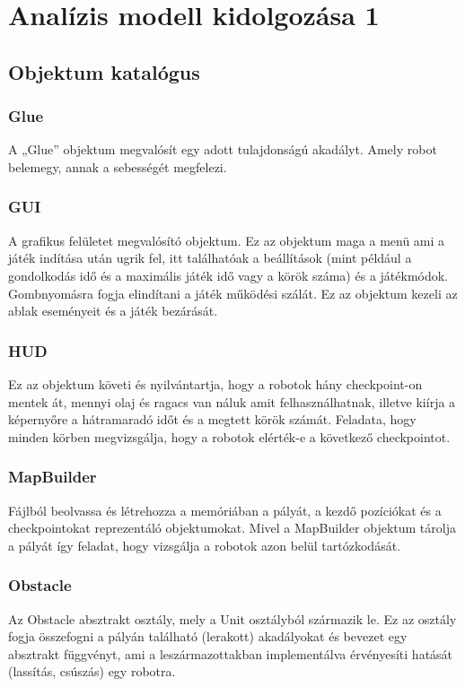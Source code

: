 %
\chapter{Analízis modell kidolgozása 1}

\thispagestyle{fancy}

\section{Objektum katalógus}

\subsection{Glue}
A „Glue” objektum megvalósít egy adott tulajdonságú akadályt. Amely robot belemegy, annak a sebességét megfelezi. 
\subsection{GUI}
A grafikus felületet megvalósító objektum. Ez az objektum maga a menü ami a játék indítása után ugrik fel, itt találhatóak a beállítások (mint például a gondolkodás idő és a maximális játék idő vagy a körök száma) és a játékmódok. Gombnyomásra fogja elindítani a játék működési szálát. Ez az objektum kezeli az ablak eseményeit és a játék bezárását.
\subsection{HUD}
Ez az objektum követi és nyilvántartja, hogy a robotok hány checkpoint-on mentek át, mennyi olaj és ragacs van náluk amit felhasználhatnak, illetve kiírja a képernyőre a hátramaradó időt és a megtett körök számát. Feladata, hogy minden körben megvizsgálja, hogy a robotok elérték-e a következő checkpointot.
\subsection{MapBuilder}
Fájlból beolvassa és létrehozza a memóriában a pályát, a kezdő pozíciókat és a checkpointokat reprezentáló objektumokat.  Mivel a  MapBuilder objektum tárolja a pályát így feladat, hogy vizsgálja a robotok azon belül tartózkodását.  
\subsection{Obstacle}
Az Obstacle absztrakt osztály, mely a Unit osztályból származik le. Ez az osztály fogja összefogni a pályán található (lerakott) akadályokat és bevezet egy absztrakt függvényt, ami a leszármazottakban implementálva érvényesíti hatását (lassítás, csúszás) egy robotra.

